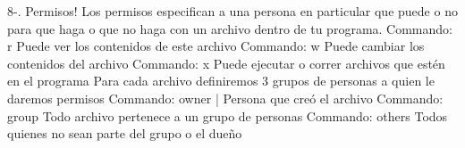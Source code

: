 \documentclass{article}
\begin{document}
8-. Permisos!
	Los permisos especifican a una persona en particular que puede o no para que haga o que no haga con un archivo dentro de tu programa.
		Commando: r
			Puede ver los contenidos de este archivo
		Commando: w
			Puede cambiar los contenidos del archivo
		Commando: x
			Puede ejecutar o correr archivos que estén en el programa
	Para cada archivo definiremos 3 grupos de personas a quien le daremos permisos
		Commando: owner
	|		Persona que creó el archivo
		Commando: group
			Todo archivo pertenece a un grupo de personas
		Commando: others
			Todos quienes no sean parte del grupo o el dueño
\end{document}
